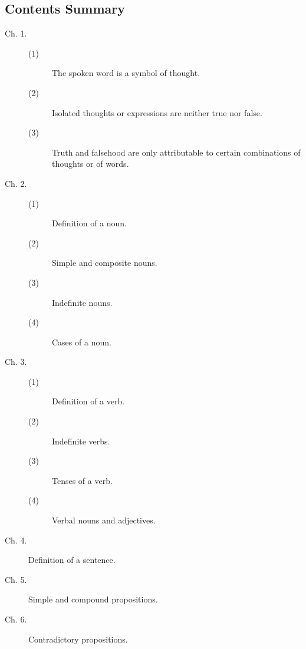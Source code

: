 
\subsection*{Contents Summary}

\renewcommand{\aref}{\arefB}

\begin{description}
\item[Ch. 1.]
\begin{description}%
\item[(1)] The spoken word is a symbol of thought.
\item[(2)] Isolated thoughts or expressions are neither true nor false. 
\item[(3)] Truth and falsehood are only attributable to certain combinations of thoughts or of words. 
\end{description}

\item[Ch. 2.]
\begin{description}
 \item[(1)] Definition of a noun. 

\item[(2)] Simple and composite nouns. 

\item[(3)] Indefinite nouns. 

\item[(4)] Cases of a noun. 
\end{description}

\item[Ch. 3.]
\begin{description}
 \item[(1)] Definition of a verb. 

\item[(2)] Indefinite verbs. 

\item[(3)] Tenses of a verb. 

\item[(4)] Verbal nouns and adjectives. 
\end{description}

\item[Ch. 4.]
Definition of a sentence. 

\item[Ch. 5.]
Simple and compound propositions. 

\item[Ch. 6.]
Contradictory propositions. 


\end{description}
